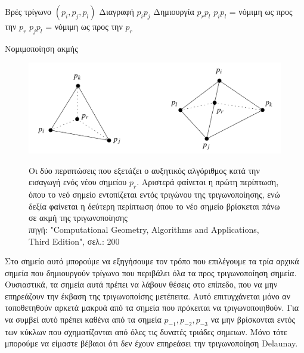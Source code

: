 \documentclass[oneside,12pt]{book}
\newenvironment{matlab}
	{\begin{figure}[hp]\centering\captionsetup{justification=centering}}
	{\end{figure}}
\theoremstyle{definition}
\begin{document}
\begin{algorithm}[H]
	\SetAlgoLined

	Βρές τρίγωνο \((p_i, p_j, p_l)\) \;
	{Διαγραφή \(p_i p_j\) \;
	Δημιουργία \(p_r p_l\) \;
	\(p_i p_l\) = νόμιμη ως προς την \(p_r\) \;
	\(p_j p_l\) = νόμιμη ως προς την \(p_r\) \;}

	\caption{Νομιμοποίηση ακμής}
\end{algorithm}

\begin{matlab}
	\includegraphics[scale=0.3]{images/incremental.png}
	\caption{Οι δύο περιπτώσεις που εξετάζει ο αυξητικός αλγόριθμος κατά την εισαγωγή ενός νέου σημείου \(p_r\). Αριστερά φαίνεται η πρώτη περίπτωση, όπου το νεό σημείο εντοπίζεται εντός τριγώνου της τριγωνοποίησης, ενώ δεξία φαίνεται η δεύτερη περίπτωση όπου το νέο σημείο βρίσκεται πάνω σε ακμή της τριγωνοποίησης \\ πηγή: "Computational Geometry, Algorithms and Applications, Third Edition", σελ.: 200}
\end{matlab}

Στο σημείο αυτό μπορούμε να εξηγήσουμε τον τρόπο που επιλέγουμε τα τρία αρχικά σημεία που δημιουργούν τρίγωνο που περιβάλει όλα τα προς τριγωνοποίηση σημεία. Ουσιαστικά, τα σημεία αυτά πρέπει να λάβουν θέσεις στο επίπεδο, που να μην επηρεάζουν την έκβαση της τριγωνοποίσης μετέπειτα. Αυτό επιτυγχάνεται μόνο αν τοποθετηθούν αρκετά μακρυά από τα σημεία που πρόκειται να τριγωνοποιηθούν. Για να συμβεί αυτό πρέπει καθένα από τα σημεία \(p_{-1}, p_{-2}, p_{-3}\) να μην βρίσκονται εντός των κύκλων που σχηματίζονται από όλες τις δυνατές τριάδες σημειων. Μόνο τότε μπορούμε να είμαστε βέβαιοι ότι δεν έχουν επηρεάσει την τριγωνοποίηση Delaunay. \\
\end{document}
